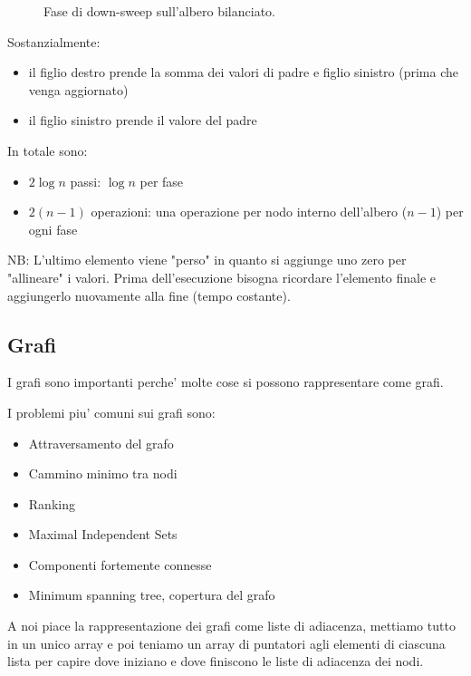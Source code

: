 \begin{figure}[htbp]
    \centering
    
    \caption{Fase di down-sweep sull'albero bilanciato.}
    \label{fig:downsweep}
\end{figure}

Sostanzialmente: 
\begin{itemize}
    \item il figlio destro prende la somma dei valori di padre e figlio sinistro (prima che venga aggiornato)
    
    \item il figlio sinistro prende il valore del padre
\end{itemize}

In totale sono:
\begin{itemize}
    \item $2 \log n$ passi: $\log n$ per fase
    
    \item $2 (n-1)$ operazioni: una operazione per nodo interno dell'albero ($n-1$) per ogni fase
\end{itemize}

NB: L'ultimo elemento viene "perso" in quanto si aggiunge uno zero per "allineare" i valori. Prima dell'esecuzione bisogna ricordare l'elemento finale e aggiungerlo nuovamente alla fine (tempo costante).

\subsection{Grafi}
I grafi sono importanti perche' molte cose si possono rappresentare come grafi.

I problemi piu' comuni sui grafi sono:
\begin{itemize}
    \item Attraversamento del grafo
    \item Cammino minimo tra nodi
    \item Ranking
    \item Maximal Independent Sets 
    \item Componenti fortemente connesse
    \item Minimum spanning tree, copertura del grafo
\end{itemize}

A noi piace la rappresentazione dei grafi come liste di adiacenza, mettiamo tutto in un unico array e poi teniamo un array di puntatori agli elementi di ciascuna lista per capire dove iniziano e dove finiscono le liste di adiacenza dei nodi.

